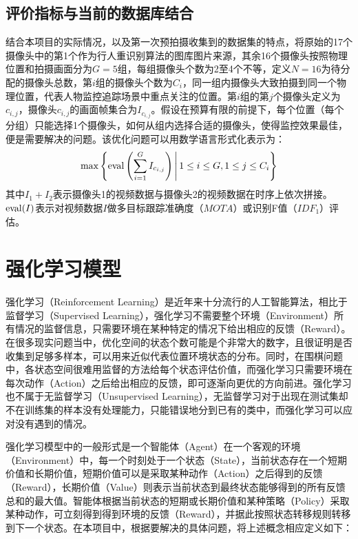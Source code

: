 \subsection{评价指标与当前的数据库结合}
结合本项目的实际情况，以及第一次预拍摄收集到的数据集的特点，将原始的17个摄像头中的第1个作为行人重识别算法的图库图片来源，其余16个摄像头按照物理位置和拍摄画面分为$G=5$组，每组摄像头个数为2至4个不等，定义$N=16$为待分配的摄像头总数，第$i$组的摄像头个数为$C_i$，同一组内摄像头大致拍摄到同一个物理位置，代表人物监控追踪场景中重点关注的位置。第$i$组的第$j$个摄像头定义为$c_{i,j}$，摄像头$c_{i,j}$的画面帧集合为$I_{c_{i,j}}$。假设在预算有限的前提下，每个位置（每个分组）只能选择1个摄像头，如何从组内选择合适的摄像头，使得监控效果最佳，便是需要解决的问题。该优化问题可以用数学语言形式化表示为：
\begin{equation}
\max \left\{\mathop{\rm eval}\left(\sum_{i=1}^G I_{c_{i,j}}\right)\,\middle\vert\, 1\leq i \leq G, 1\leq j \leq C_i\right\}
\end{equation}
其中$I_1+I_2$表示摄像头1的视频数据与摄像头2的视频数据在时序上依次拼接。$\mathop{\rm eval}(I)$表示对视频数据$I$做多目标跟踪准确度（$\mathit{MOTA}$）或识别F值（$\mathit{IDF_1}$）评估。

\section{强化学习模型}
强化学习（Reinforcement Learning）是近年来十分流行的人工智能算法，相比于监督学习（Supervised Learning），强化学习不需要整个环境（Environment）所有情况的监督信息，只需要环境在某种特定的情况下给出相应的反馈（Reward）。在很多现实问题当中，优化空间的状态个数可能是个非常大的数字，且很证明是否收集到足够多样本，可以用来近似代表位置环境状态的分布。同时，在围棋问题中\cite{silver2016mastering}，各状态空间很难用监督的方法给每个状态评估价值，而强化学习只需要环境在每次动作（Action）之后给出相应的反馈，即可逐渐向更优的方向前进。强化学习也不属于无监督学习（Unsupervised Learning），无监督学习对于出现在测试集却不在训练集的样本没有处理能力，只能错误地分到已有的类中，而强化学习可以应对没有遇到的情况。

强化学习模型中的一般形式是一个智能体（Agent）在一个客观的环境（Environment）中，每一个时刻处于一个状态（State），当前状态存在一个短期价值和长期价值，短期价值可以是采取某种动作（Action）之后得到的反馈（Reward），长期价值（Value）则表示当前状态到最终状态能够得到的所有反馈总和的最大值。智能体根据当前状态的短期或长期价值和某种策略（Policy）采取某种动作，可立刻得到得到环境的反馈（Reward），并据此按照状态转移规则转移到下一个状态。在本项目中，根据要解决的具体问题，将上述概念相应定义如下：

